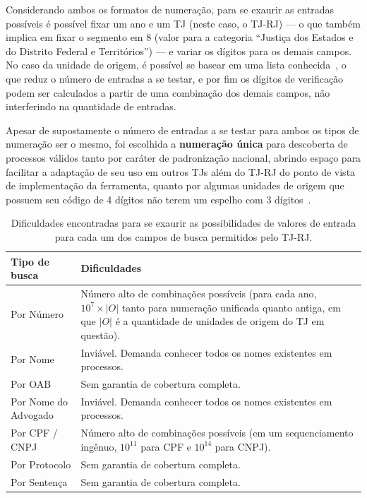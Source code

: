 Considerando ambos os formatos de numeração, para se exaurir as entradas
possíveis é possível fixar um ano e um TJ (neste caso, o TJ-RJ) --- o que
também implica em fixar o segmento em 8 (valor para a categoria ``Justiça dos
Estados e do Distrito Federal e Territórios'') --- e variar os dígitos para os
demais campos. No caso da unidade de origem, é possível se basear em uma lista
conhecida~\cite{spec:tjrj-codigos-unidades-de-origem}, o que reduz o número de
entradas a se testar, e por fim os dígitos de verificação podem ser calculados
a partir de uma combinação dos demais campos, não interferindo na quantidade de
entradas.

Apesar de supostamente o número de entradas a se testar para ambos os tipos de
numeração ser o mesmo, foi escolhida a \textbf{numeração única} para descoberta
de processos válidos tanto por caráter de padronização nacional, abrindo espaço
para facilitar a adaptação de seu uso em outros TJs além do TJ-RJ do ponto de
vista de implementação da ferramenta, quanto por algumas unidades de origem que
possuem seu código de 4 dígitos não terem um espelho com 3
dígitos~\cite{spec:tjrj-codigos-unidades-de-origem}.

\begin{table}[tb]
    \centering
    \begin{tabular}{lp{}}
        \toprule
        Tipo de busca & Dificuldades \\
        \midrule
        Por Número & Número alto de combinações possíveis (para cada ano,
                     $10^{7} \times |O|$ tanto para numeração unificada quanto
                     antiga, em que $|O|$ é a quantidade de unidades de origem
                     do TJ em questão). \\
        Por Nome & Inviável. Demanda conhecer todos os nomes existentes em processos. \\
        Por OAB & Sem garantia de cobertura completa. \\
        Por Nome do Advogado & Inviável. Demanda conhecer todos os nomes existentes em processos. \\
        Por CPF / CNPJ & Número alto de combinações possíveis (em um sequenciamento ingênuo, $10^{11}$ para CPF e $10^{14}$ para CNPJ). \\
        Por Protocolo & Sem garantia de cobertura completa. \\
        Por Sentença & Sem garantia de cobertura completa. \\
        \bottomrule
    \end{tabular}
    \caption{%
        Dificuldades encontradas para se exaurir as possibilidades de valores
        de entrada para cada um dos campos de busca permitidos pelo TJ-RJ.
    }
    \label{tbl:dificuldades-tipos-de-busca}
\end{table}

